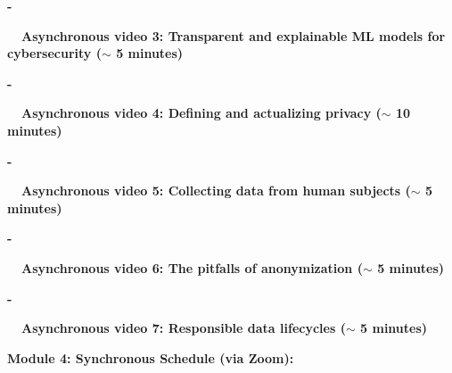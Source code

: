 \documentclass[12pt]{article}
\renewcommand{\_}{\kern-1.5pt\textunderscore\kern-1.5pt}
\begin{document}
\begin{adjustwidth}{0.5in}{0.0in}
\textbf{-}{\fontsize{7pt}{8.4pt}\selectfont \textbf{\ \  \tab Asynchronous video 3: Transparent and explainable ML models for cybersecurity ($ \sim $ 5 minutes)}\par}\par

\end{adjustwidth}

\begin{adjustwidth}{0.5in}{0.0in}
\textbf{-}{\fontsize{7pt}{8.4pt}\selectfont \textbf{\ \  \tab Asynchronous video 4: Defining and actualizing privacy ($ \sim $ 10 minutes)}\par}\par

\end{adjustwidth}

\begin{adjustwidth}{0.5in}{0.0in}
\textbf{-}{\fontsize{7pt}{8.4pt}\selectfont \textbf{\ \  \tab Asynchronous video 5: Collecting data from human subjects ($ \sim $ 5 minutes)}\par}\par

\end{adjustwidth}

\begin{adjustwidth}{0.5in}{0.0in}
\textbf{-}{\fontsize{7pt}{8.4pt}\selectfont \textbf{\ \  \tab Asynchronous video 6: The pitfalls of anonymization ($ \sim $ 5 minutes)}\par}\par

\end{adjustwidth}

\begin{adjustwidth}{0.5in}{0.0in}
\textbf{-}{\fontsize{7pt}{8.4pt}\selectfont \textbf{\ \  \tab Asynchronous video 7: Responsible data lifecycles ($ \sim $ 5 minutes)}\par}\par

\end{adjustwidth}

\textbf{ }\par

\textbf{ }\par

\textbf{Module 4: Synchronous Schedule (via Zoom):}\par
\end{document}
